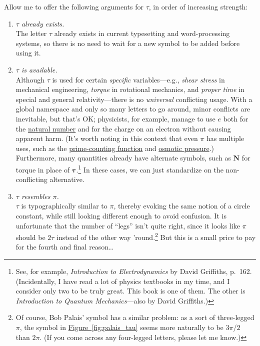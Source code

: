 \documentclass{article}
\begin{document}
Allow me to offer the following arguments for $\tau$, in order of increasing strength:

\begin{enumerate}
  
  \item \emph{$\tau$ already exists.} \\ The letter $\tau$ already exists in current typesetting and word-processing systems, so there is no need to wait for a new symbol to be added before using it.
  
  \item \emph{$\tau$ is available.} \\ Although $\tau$ is used for certain \emph{specific} variables---e.g., \emph{shear stress} in mechanical engineering, \emph{torque} in rotational mechanics, and \emph{proper time} in special and general relativity---there is no \emph{universal} conflicting usage. With a global namespace and only so many letters to go around, minor conflicts are inevitable, but that's OK; physicists, for example, manage to use $e$ both for the \href{http://en.wikipedia.org/wiki/E_(mathematical_constant)}{natural number} and for the charge on an electron without causing apparent harm. (It's worth noting in this context that even $\pi$ has multiple uses, such as the \href{http://mathworld.wolfram.com/PrimeCountingFunction.html}{prime-counting function} and \href{http://www.chem.purdue.edu/gchelp/howtosolveit/Solutions/osmoticpressure.html}{osmotic pressure}.) Furthermore, many quantities already have alternate symbols, such as $\mathbf{N}$ for torque in place of $\boldsymbol{\tau}$.\footnote{See, for example, \emph{Introduction to Electrodynamics} by David Griffiths, p.~162. (Incidentally, I have read a lot of physics textbooks in my time, and I consider only two to be truly great. This book is one of them. The other is \emph{Introduction to Quantum Mechanics}---also by David Griffiths.)} In these cases, we can just standardize on the non-conflicting alternative. 
  
  \item \emph{$\tau$ resembles $\pi$.} \\ $\tau$ is typographically similar to $\pi$, thereby evoking the same notion of a circle constant, while still looking different enough to avoid confusion. It is unfortunate that the number of ``legs'' isn't quite right, since it looks like $\pi$ should be $2\tau$ instead of the other way 'round.\footnote{Of course, Bob Palais' symbol has a similar problem: as a sort of three-legged $\pi$, the symbol in \hyperref[fig:palais_tau]{Figure~}\ref{fig:palais_tau} seems more naturally to be $3\pi$/$2$ than $2\pi$. (If you come across any four-legged letters, please let me know.)} But this is a small price to pay for the fourth and final reason\ldots
%
  

\end{enumerate}
\end{document}
